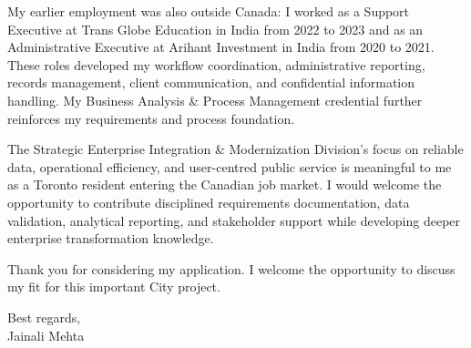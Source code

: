 \documentclass[letterpaper,10pt]{article}
\begin{document}
My earlier employment was also outside Canada: I worked as a Support Executive at Trans Globe Education in India from 2022 to 2023 and as an Administrative Executive at Arihant Investment in India from 2020 to 2021. These roles developed my workflow coordination, administrative reporting, records management, client communication, and confidential information handling. My Business Analysis \& Process Management credential further reinforces my requirements and process foundation.

The Strategic Enterprise Integration \& Modernization Division's focus on reliable data, operational efficiency, and user-centred public service is meaningful to me as a Toronto resident entering the Canadian job market. I would welcome the opportunity to contribute disciplined requirements documentation, data validation, analytical reporting, and stakeholder support while developing deeper enterprise transformation knowledge.

Thank you for considering my application. I welcome the opportunity to discuss my fit for this important City project.

Best regards,\\[8pt]
Jainali Mehta
\end{document}
